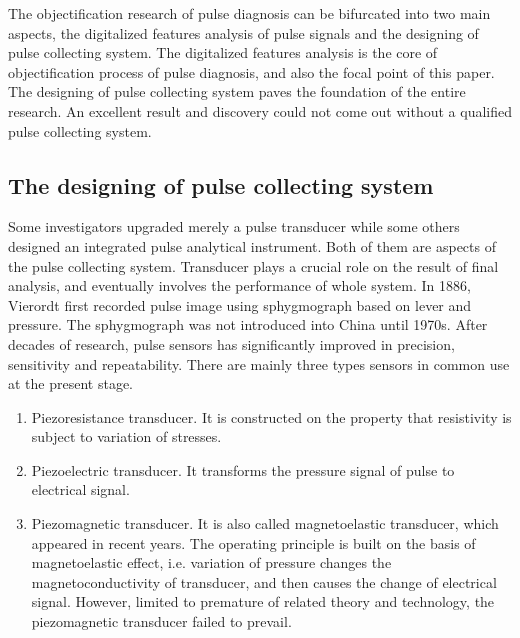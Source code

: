 The objectification research of pulse diagnosis can be bifurcated into
two main aspects, the digitalized features analysis of pulse signals and
the designing of pulse collecting system. The digitalized features
analysis is the core of objectification process of pulse diagnosis,
and also the focal point of this paper. The designing of pulse
collecting system paves the foundation of the entire research. An
excellent result and discovery could not come out without a qualified
pulse collecting system. 

\subsection{The designing of pulse collecting system}
Some investigators upgraded merely a pulse transducer while some
others designed an integrated pulse analytical instrument. Both of
them are aspects of the pulse collecting system. Transducer plays a
crucial role on the result of final analysis, and eventually involves
the performance of whole system. In 1886, Vierordt first recorded
pulse image using sphygmograph based on lever and pressure. The
sphygmograph was not introduced into China until 1970s. After decades
of research, pulse sensors has significantly improved in precision,
sensitivity and repeatability.  There are mainly three types sensors
in common use at the present stage.
\begin{enumerate}
    \item Piezoresistance transducer. It is constructed on
        the property that resistivity is subject to variation of
        stresses. 
    \item Piezoelectric transducer. It transforms the pressure signal
        of pulse to electrical signal. 
    \item Piezomagnetic transducer. It is also called magnetoelastic
        transducer, which appeared in recent years. The operating
        principle is built on the basis of magnetoelastic effect, i.e.
        variation of pressure changes the magnetoconductivity of
        transducer, and then causes the change of electrical signal.
        However, limited to premature of related theory and
        technology, the piezomagnetic transducer failed to prevail. 
\end{enumerate}

